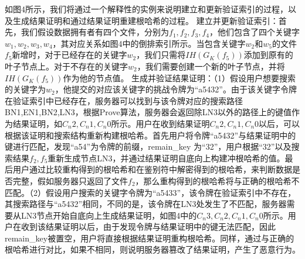 如图4所示，我们将通过一个解释性的实例来说明建立和更新验证索引的过程，以及生成结果证明和通过结果证明重建根哈希的过程。
建立并更新验证索引：首先，我们假设数据拥有者有四个文件，分别为$f_1,f_2,f_3,f_4$，他们包含了四个关键字$w_1,w_2,w_3,w_4$，其对应关系如图4中的倒排索引所示。当包含关键字$w_2$和$w_5$的文件$f_5$新增时，对于已经存在的关键字$w_2$，我们只需将$IH(G_K(f_5))$添加到原有的叶子节点上。对于不存在的关键字$w_2$，我们需要创建一个新的叶子节点，并将$IH(G_K(f_5))$作为他的节点值。
生成并验证结果证明：（1）假设用户想要搜索的关键字为$w_2$，他提交的对应该关键字的挑战令牌为“a5432”。由于该关键字令牌在验证索引中已经存在，服务器可以找到与该令牌对应的搜索路径{BN1,EN1,BN2,LN3}，根据Prove算法，服务器会返回除LN3以外的路径上的键值作为结果证明，如$C_n2,C_n1,C_n0$所示。用户在收到结果证明$C_n2,C_n1,C_n0$以后，可以根据该证明和搜索结构重新构建根哈希。首先用户将令牌“a5432”与结果证明中的键进行匹配，发现“a54”为令牌的前缀，remain\_key 为“32”，用户根据“32”以及搜索结果$f_2,f_5$重新生成节点LN3，并通过结果证明自底向上构建冲根哈希的值。最后用户通过比较重构得到的根哈希和在鉴别符中解密得到的根哈希，来判断数据是否完整，假如服务器只返回了文件$f_2$，那么重构得到的根哈希将与正确的根哈希不匹配。（2）假设用户搜索的关键字令牌为“a5433”，该令牌在验证索引中不存在，其搜索路径与“a5432”相同，不同的是，该令牌在LN3处发生了不匹配，服务器需要从LN3节点开始自底向上生成结果证明，如图4中的$C_n3,C_n2,C_n1,C_n0$所示。用户在收到该结果证明以后，由于发现令牌与结果证明中的键无法匹配，因此remain\_key被置空，用户将直接根据结果证明重构根哈希。同样，通过与正确的根哈希进行对比，如果不相同，则说明服务器篡改了结果证明，产生了恶意行为。


